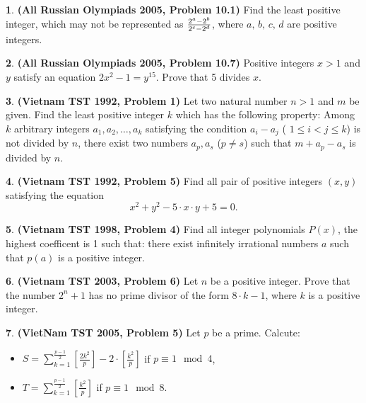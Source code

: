 \documentclass{article}
\theoremstyle{definition}
\newtheorem{p}{}
\begin{document}
\begin{p}{\bf (All Russian Olympiads 2005, Problem 10.1)}
Find the least positive integer, which may not be represented as ${2^a-2^b\over 2^c-2^d}$, where $a,\,b,\,c,\,d$ are positive integers.
\end{p}



\begin{p}{\bf (All Russian Olympiads 2005, Problem 10.7)}
Positive integers $x>1$ and $y$  satisfy an equation $2x^2-1=y^{15}$. Prove that 5 divides $x$.
\end{p}





\begin{p}{\bf (Vietnam TST 1992, Problem 1)}
Let two natural number $n > 1$ and $m$ be given. Find the least positive integer $k$ which has the following property: Among $k$ arbitrary integers $a_1, a_2, \ldots, a_k$ satisfying the condition $a_i - a_j$ ( $1 \leq i < j \leq k$) is not divided by $n$, there exist two numbers $a_p, a_s$ ($p \neq s$) such that  $m + a_p - a_s$ is divided by $n$.
\end{p}



\begin{p}{\bf (Vietnam TST 1992, Problem 5)}
Find all pair of positive integers $(x, y)$ satisfying the equation  
\[x^2 + y^2 - 5 \cdot x \cdot y + 5 = 0.\]
\end{p}



\begin{p}{\bf (Vietnam TST 1998, Problem 4)}
Find all integer polynomials $P(x)$, the highest coefficent is 1 such that: there exist infinitely irrational numbers $a$ such that $p(a)$ is a positive integer.
\end{p}



\begin{p}{\bf (Vietnam TST 2003, Problem 6)}
Let $n$ be a positive integer. Prove that the number $2^n + 1$ has no prime divisor of the form $8 \cdot k - 1$, where $k$ is a positive integer.
\end{p}





\begin{p}{\bf (VietNam TST 2005, Problem 5)}
Let $p$ be a prime. Calcute:
\begin{itemize}
\item $S=\sum_{k=1}^{\frac{p-1}{2}} \left[\frac{2k^2}{p}\right]-2 \cdot \left[\frac{k^2}{p}\right]$  if $ p\equiv 1 \mod 4$,

\item $T=\sum_{k=1}^{\frac{p-1}{2}} \left[\frac{k^2}{p}\right]$   if $p\equiv 1 \mod 8$.
\end{itemize}
\end{p}
\end{document}
